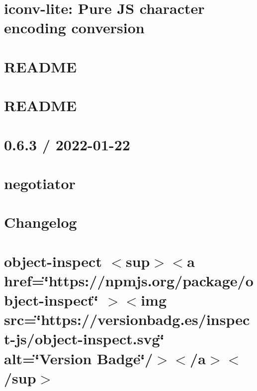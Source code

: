 \documentclass[twoside]{book}
\newcommand{\+}{\discretionary{\mbox{\scriptsize$\hookleftarrow$}}{}{}}
\begin{document}
\chapter{iconv-\/lite\+: Pure JS character encoding conversion}
\label{md_Backend_nodejs_node_modules_mysql2_node_modules_iconv_lite_README}

\chapter{README}
\label{md_Backend_nodejs_node_modules_mysql2_README}

\chapter{README}
\label{md_Backend_nodejs_node_modules_named_placeholders_README}

\chapter{0.6.3 / 2022-\/01-\/22}
\label{md_Backend_nodejs_node_modules_negotiator_HISTORY}

\chapter{negotiator}
\label{md_Backend_nodejs_node_modules_negotiator_README}

\chapter{Changelog}
\label{md_Backend_nodejs_node_modules_object_inspect_CHANGELOG}

\chapter{object-\/inspect \texorpdfstring{$<$}{<}sup\texorpdfstring{$>$}{>}\texorpdfstring{$<$}{<}a href=\char`\"{}https\+://npmjs.\+org/package/object-\/inspect\char`\"{} \texorpdfstring{$>$}{>}\texorpdfstring{$<$}{<}img src=\char`\"{}https\+://versionbadg.\+es/inspect-\/js/object-\/inspect.\+svg\char`\"{} alt=\char`\"{}\+Version Badge\char`\"{}/\texorpdfstring{$>$}{>}\texorpdfstring{$<$}{<}/a\texorpdfstring{$>$}{>}\texorpdfstring{$<$}{<}/sup\texorpdfstring{$>$}{>}}
\label{md_Backend_nodejs_node_modules_object_inspect_readme}

\end{document}
